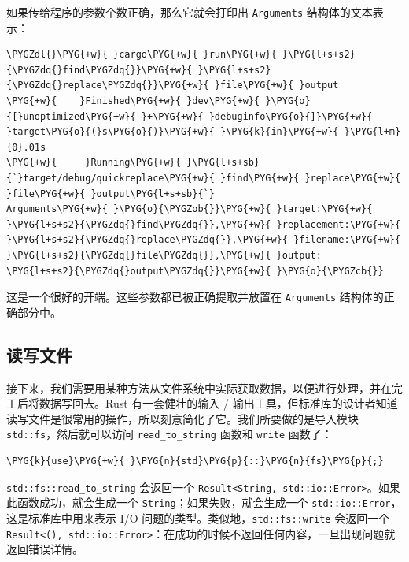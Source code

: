 如果传给程序的参数个数正确，那么它就会打印出 \texttt{Arguments} 结构体的文本表示：

\begin{Verbatim}[commandchars=\\\{\},breaklines=true,breakanywhere=true,fontsize=\codefont,xleftmargin=17bp]
\PYGZdl{}\PYG{+w}{ }cargo\PYG{+w}{ }run\PYG{+w}{ }\PYG{l+s+s2}{\PYGZdq{}find\PYGZdq{}}\PYG{+w}{ }\PYG{l+s+s2}{\PYGZdq{}replace\PYGZdq{}}\PYG{+w}{ }file\PYG{+w}{ }output
\PYG{+w}{    }Finished\PYG{+w}{ }dev\PYG{+w}{ }\PYG{o}{[}unoptimized\PYG{+w}{ }+\PYG{+w}{ }debuginfo\PYG{o}{]}\PYG{+w}{ }target\PYG{o}{(}s\PYG{o}{)}\PYG{+w}{ }\PYG{k}{in}\PYG{+w}{ }\PYG{l+m}{0}.01s
\PYG{+w}{     }Running\PYG{+w}{ }\PYG{l+s+sb}{`}target/debug/quickreplace\PYG{+w}{ }find\PYG{+w}{ }replace\PYG{+w}{ }file\PYG{+w}{ }output\PYG{l+s+sb}{`}
Arguments\PYG{+w}{ }\PYG{o}{\PYGZob{}}\PYG{+w}{ }target:\PYG{+w}{ }\PYG{l+s+s2}{\PYGZdq{}find\PYGZdq{}},\PYG{+w}{ }replacement:\PYG{+w}{ }\PYG{l+s+s2}{\PYGZdq{}replace\PYGZdq{}},\PYG{+w}{ }filename:\PYG{+w}{ }\PYG{l+s+s2}{\PYGZdq{}file\PYGZdq{}},\PYG{+w}{ }output:
\PYG{l+s+s2}{\PYGZdq{}output\PYGZdq{}}\PYG{+w}{ }\PYG{o}{\PYGZcb{}}
\end{Verbatim}

这是一个很好的开端。这些参数都已被正确提取并放置在 \texttt{Arguments} 结构体的正确部分中。

\subsection{读写文件}

接下来，我们需要用某种方法从文件系统中实际获取数据，以便进行处理，并在完工后将数据写回去。Rust 有一套健壮的输入 / 输出工具，但标准库的设计者知道读写文件是很常用的操作，所以刻意简化了它。我们所要做的是导入模块 \texttt{std::fs}，然后就可以访问 \texttt{read\_to\_string} 函数和 \texttt{write} 函数了：

\begin{Verbatim}[commandchars=\\\{\},breaklines=true,breakanywhere=true,fontsize=\codefont,xleftmargin=17bp]
\PYG{k}{use}\PYG{+w}{ }\PYG{n}{std}\PYG{p}{::}\PYG{n}{fs}\PYG{p}{;}
\end{Verbatim}

\texttt{std::fs::read\_to\_string} 会返回一个 \texttt{Result<String, std::io::Error>}。如果此函数成功，就会生成一个 \texttt{String}；如果失败，就会生成一个 \texttt{std::io::Error}，这是标准库中用来表示 I/O 问题的类型。类似地，\texttt{std::fs::write} 会返回一个 \texttt{Result<(), std::io::Error>}：在成功的时候不返回任何内容，一旦出现问题就返回错误详情。

